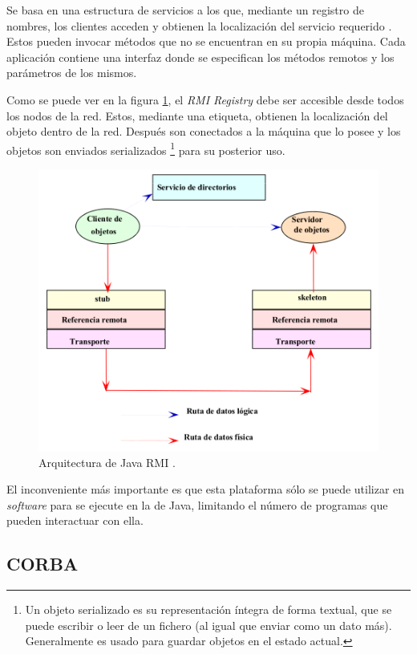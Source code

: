 Se basa en una estructura de servicios a los que, mediante un registro de 
nombres, los clientes acceden y obtienen la localización del servicio 
requerido \cite{JavaRMI}. Estos pueden invocar métodos que no se encuentran en su 
propia máquina. Cada aplicación contiene una interfaz donde se 
especifican los métodos remotos y los parámetros de los mismos.

Como se puede ver en la figura \ref{fig:rmi}, el \emph{RMI Registry} 
debe ser accesible desde todos los nodos de la red. Estos, mediante 
una etiqueta, obtienen la localización del objeto dentro de la red. 
Después son conectados a la máquina que lo posee y los objetos son 
enviados serializados \footnote{Un objeto serializado es su 
representación íntegra de forma textual, que se puede escribir o leer 
de un fichero (al igual que enviar como un dato más). Generalmente es 
usado para guardar objetos en el estado actual.} para su posterior uso.

\begin{figure}
	\centering
	\includegraphics[scale=0.4]{images/rmi.png}
	\caption[Estructura de Java RMI]{Arquitectura de Java RMI \cite{DAD}.}
	\label{fig:rmi}
\end{figure}

El inconveniente más importante es que esta plataforma sólo se puede 
utilizar en \emph{software} para se ejecute en la  de Java, 
limitando el número de programas que pueden interactuar con ella.

\subsection{CORBA}

